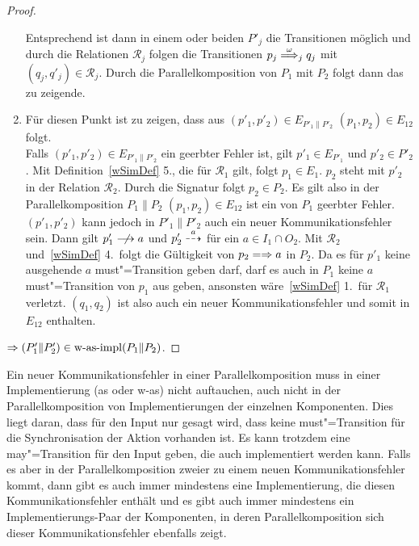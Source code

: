 \begin{proof}
\begin{enumerate}
      Entsprechend ist dann in einem oder beiden $P'_j$ die Transitionen
      möglich und durch die Relationen $\mathcal{R}_j$ folgen die Transitionen
      $p_j \weakmust[\omega]_j q_j$ mit $(q_j,q'_j)\in\mathcal{R}_j$. Durch
      die Parallelkomposition von $P_1$ mit $P_2$ folgt dann das zu zeigende.
    \item Für diesen Punkt ist zu zeigen, dass aus $(p'_1,p'_2)\in
      E_{P'_1\|P'_2}$ $(p_1,p_2)\in E_{12}$ folgt.\\
      Falls $(p'_1,p'_2)\in E_{P'_1\|P'_2}$ ein geerbter Fehler ist, gilt
      \oBdA{} $p'_1\in E_{P'_1}$ und $p'_2\in P'_2$. Mit
      Definition~\ref{wSimDef} 5., die für $\mathcal{R}_1$ gilt, folgt $p_1\in
      E_1$. $p_2$ steht mit $p'_2$ in der Relation $\mathcal{R}_2$. Durch die
      Signatur folgt $p_2\in P_2$. Es gilt also in der Parallelkomposition
      $P_1\|P_2$ $(p_1,p_2)\in E_{12}$ ist ein von $P_1$ geerbter Fehler.
      $(p'_1,p'_2)$ kann jedoch in $P'_1\|P'_2$ auch ein neuer
      Kommunikationsfehler sein. Dann gilt \oBdA{} $p'_1\nmust{a}$ und
      $p'_2\may[a]$ für ein $a\in I_1\cap O_2$. Mit $\mathcal{R}_2$
      und~\ref{wSimDef} 4.\ folgt die Gültigkeit von $p_2\weakmay{a}$ in $P_2$.
      Da es für $p'_1$ keine ausgehende $a$ must"=Transition geben darf, darf
      es auch in $P_1$ keine $a$ must"=Transition von $p_1$ aus geben,
      ansonsten wäre~\ref{wSimDef} 1.\ für $\mathcal{R}_1$ verletzt.
      $(q_1,q_2)$ ist also auch ein neuer Kommunikationsfehler und somit in
      $E_{12}$ enthalten.
  \end{enumerate}
  $\Rightarrow (P'_1\|P'_2)\in\mathrm{w}\text{-}\mathrm{as}\text{-}\mathrm{impl} (P_1\|P_2)$.
\end{proof}

Ein neuer Kommunikationsfehler in einer Parallelkomposition muss in einer
Implementierung (as oder w-as) nicht auftauchen, auch nicht in der
Parallelkomposition von Implementierungen der einzelnen Komponenten. Dies liegt
daran, dass für den Input nur gesagt wird, dass keine must"=Transition für die
Synchronisation der Aktion vorhanden ist. Es kann trotzdem eine
may"=Transition für den Input geben, die auch implementiert werden kann.
Falls es aber in der Parallelkomposition zweier \MEIO{} zu einem neuen
Kommunikationsfehler kommt, dann gibt es auch immer mindestens eine
Implementierung, die diesen Kommunikationsfehler enthält und es gibt auch immer
mindestens ein Implementierungs-Paar der Komponenten, in deren
Parallelkomposition sich dieser Kommunikationsfehler ebenfalls zeigt.
